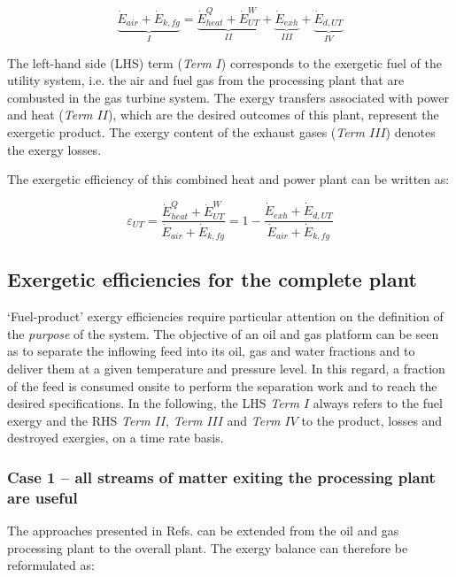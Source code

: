 \documentclass[times,3p]{elsarticle}
\begin{document}
\begin{equation}
	\underbrace{\dot{E}_{air}+\dot{E}_{k,fg}}_{I}=\underbrace{\dot{E}^{Q}_{heat}+\dot{E}^{W}_{UT}}_{II}+\underbrace{\dot{E}_{exh}}_{III}+\underbrace{\dot{E}_{d,UT}}_{IV}
\end{equation}

The left-hand side (LHS) term (\emph{Term $I$}) corresponds to the exergetic fuel of the utility system, i.e. the air and fuel gas from the processing plant that are combusted in the gas turbine system. The exergy transfers associated with power and heat (\emph{Term $II$}), which are the desired outcomes of this plant, represent the exergetic product. The exergy content of the exhaust gases (\emph{Term $III$}) denotes the exergy losses.  

The exergetic efficiency of this combined heat and power plant can be written as:

\begin{equation}
	\varepsilon_{UT} =\frac{\dot{E}^{Q}_{heat}+\dot{E}^{W}_{UT}}{\dot{E}_{air}+\dot{E}_{k,fg}}=1-\frac{\dot{E}_{exh}+\dot{E}_{d,UT}}{\dot{E}_{air}+\dot{E}_{k,fg}}
\end{equation}
	
\subsection{Exergetic efficiencies for the complete plant}

`Fuel-product' exergy efficiencies require particular attention on the definition of the \emph{purpose} of the system. The objective of an oil and gas platform can be seen as to separate the inflowing feed into its oil, gas and water fractions and to deliver them at a given temperature and pressure level. In this regard, a fraction of the feed is consumed onsite to perform the separation work and to reach the desired specifications. In the following, the LHS \emph{Term $I$} always refers to the fuel exergy and the RHS \emph{Term $II$}, \emph{Term $III$} and \emph{Term $IV$} to the product, losses and destroyed exergies, on a time rate basis.

\subsubsection{Case 1 -- all streams of matter exiting the processing plant are useful}
 
The approaches presented in Refs. \cite{Kotas1995,Oliveira1997,Voldsund2010,Voldsund2012,Lazzaretto1999,Lazzaretto2006,Cornelissen1997,Rian2012} can be extended from the oil and gas processing plant to the overall plant. The exergy balance can therefore be reformulated as:
\end{document}
